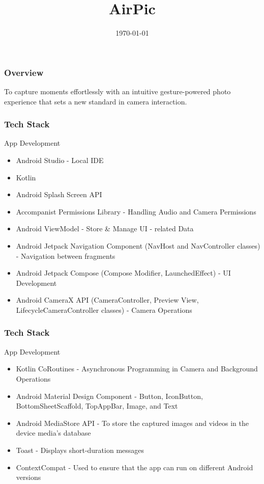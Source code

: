 \documentclass{beamer}
\title{AirPic}
\author[Jayashre SaiSree Pranathi Navya Aanya]{\teamMember{Jayashre}\and \teamMember{SaiSree Kodali}\and \teamMember{Pranathi M}\and \teamMember{Navya Nayer}\and \teamMember{Aanya Chauhan}}
\date{\today}
\begin{document}
\begin{frame}
\titlepage
\end{frame}



\begin{frame}
\frametitle{Overview}
\begin{block}{To capture moments effortlessly with an intuitive gesture-powered photo experience that sets a new standard in camera interaction.}
\end{block}
\end{frame}

\begin{frame}
\frametitle{Tech Stack}
\begin{block}{App Development}
\begin{itemize}
    \item Android Studio - Local IDE
    \item Kotlin
    \item Android Splash Screen API
    \item Accompanist Permissions Library - Handling Audio and Camera Permissions
    \item Android ViewModel - Store \& Manage UI - related Data
    \item Android Jetpack Navigation Component (NavHost and NavController classes) - Navigation between fragments
    \item Android Jetpack Compose (Compose Modifier, LaunchedEffect) - UI Development
    \item Android CameraX API (CameraController, Preview View, LifecycleCameraController classes) - Camera Operations
\end{itemize}
\end{block}
\end{frame}

\begin{frame}
\frametitle{Tech Stack}
\begin{block}{App Development}
    \begin{itemize}
    \item Kotlin CoRoutines - Asynchronous Programming in Camera and Background Operations
    \item Android Material Design Component - Button, IconButton, BottomSheetScaffold, TopAppBar, Image, and Text
    \item Android MediaStore API - To store the captured images and videos in the device media's database
    \item Toast - Displays short-duration messages
    \item ContextCompat - Used to ensure that the app can run on different Android versions
    \end{itemize}
\end{block}
\end{frame}
\end{document}
